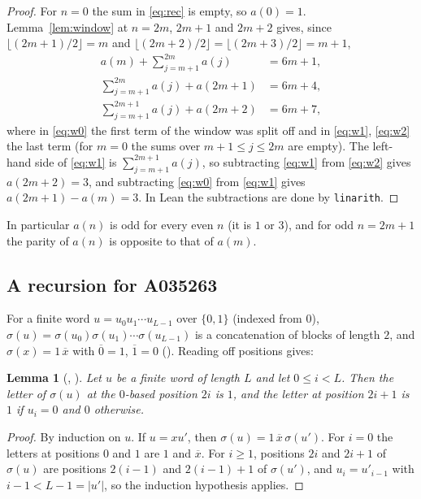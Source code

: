 \documentclass[11pt]{amsart}
\theoremstyle{plain}
\newtheorem{lemma}[theorem]{Lemma}
\theoremstyle{definition}
\begin{document}
\begin{proof}
For $n=0$ the sum in \eqref{eq:rec} is empty, so $a(0)=1$. Lemma~\ref{lem:window} at $n=2m$, $2m+1$ and $2m+2$ gives, since $\lfloor(2m+1)/2\rfloor=m$ and $\lfloor(2m+2)/2\rfloor=\lfloor(2m+3)/2\rfloor=m+1$,
\begin{align}
  a(m)+\sum_{j=m+1}^{2m}a(j)&=6m+1, \label{eq:w0}\\
  \sum_{j=m+1}^{2m}a(j)+a(2m+1)&=6m+4, \label{eq:w1}\\
  \sum_{j=m+1}^{2m+1}a(j)+a(2m+2)&=6m+7, \label{eq:w2}
\end{align}
where in \eqref{eq:w0} the first term of the window was split off and in \eqref{eq:w1}, \eqref{eq:w2} the last term (for $m=0$ the sums over $m+1\le j\le 2m$ are empty). The left-hand side of \eqref{eq:w1} is $\sum_{j=m+1}^{2m+1}a(j)$, so subtracting \eqref{eq:w1} from \eqref{eq:w2} gives $a(2m+2)=3$, and subtracting \eqref{eq:w0} from \eqref{eq:w1} gives $a(2m+1)-a(m)=3$. In Lean the subtractions are done by \texttt{linarith}.
\end{proof}

In particular $a(n)$ is odd for every even $n$ (it is $1$ or $3$), and for odd $n=2m+1$ the parity of $a(n)$ is opposite to that of $a(m)$.

\subsection{A recursion for A035263}
For a finite word $u=u_0u_1\cdots u_{L-1}$ over $\{0,1\}$ (indexed from $0$), $\sigma(u)=\sigma(u_0)\sigma(u_1)\cdots\sigma(u_{L-1})$ is a concatenation of blocks of length $2$, and $\sigma(x)=1\,\overline{x}$ with $\overline{0}=1$, $\overline{1}=0$ (). Reading off positions gives:

\begin{lemma}[, ]\label{lem:sigma}
Let $u$ be a finite word of length $L$ and let $0\le i<L$. Then the letter of $\sigma(u)$ at the $0$-based position $2i$ is $1$, and the letter at position $2i+1$ is $1$ if $u_i=0$ and $0$ otherwise.
\end{lemma}

\begin{proof}
By induction on $u$. If $u=xu'$, then $\sigma(u)=1\,\overline{x}\,\sigma(u')$. For $i=0$ the letters at positions $0$ and $1$ are $1$ and $\overline{x}$. For $i\ge1$, positions $2i$ and $2i+1$ of $\sigma(u)$ are positions $2(i-1)$ and $2(i-1)+1$ of $\sigma(u')$, and $u_i=u'_{i-1}$ with $i-1<L-1=|u'|$, so the induction hypothesis applies.
\end{proof}
\end{document}
